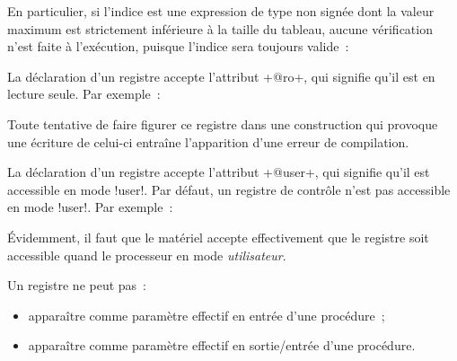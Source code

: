En particulier, si l'indice est une expression de type non signée dont la valeur maximum est strictement inférieure à la taille du tableau, aucune vérification n'est faite à l'exécution, puisque l'indice sera toujours valide~: 










La déclaration d'un registre accepte l'attribut \plm+@ro+, qui signifie qu'il est en lecture seule. Par exemple~:

Toute tentative de faire figurer ce registre dans une construction qui provoque une écriture de celui-ci entraîne l'apparition d'une erreur de compilation.






La déclaration d'un registre accepte l'attribut \plm+@user+, qui signifie qu'il est accessible en mode \plm!user!. Par défaut, un registre de contrôle n'est pas accessible en mode  \plm!user!. Par exemple~:

Évidemment, il faut que le matériel accepte effectivement que le registre soit accessible quand le processeur en mode \emph{utilisateur}.










Un registre ne peut pas~:
\begin{itemize}
  \item apparaître comme paramètre effectif en entrée d'une procédure~;
  \item apparaître comme paramètre effectif en sortie/entrée d'une procédure.
\end{itemize}

